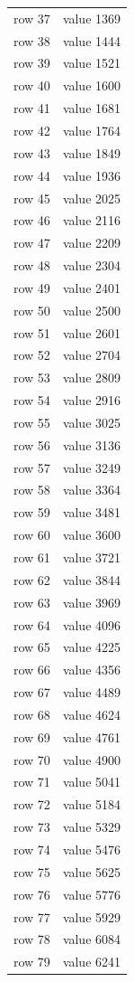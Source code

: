 \documentclass{article}
\begin{document}
\begin{longtable}{ll}
row 37 & value 1369\\
row 38 & value 1444\\
row 39 & value 1521\\
row 40 & value 1600\\
row 41 & value 1681\\
row 42 & value 1764\\
row 43 & value 1849\\
row 44 & value 1936\\
row 45 & value 2025\\
row 46 & value 2116\\
row 47 & value 2209\\
row 48 & value 2304\\
row 49 & value 2401\\
row 50 & value 2500\\
row 51 & value 2601\\
row 52 & value 2704\\
row 53 & value 2809\\
row 54 & value 2916\\
row 55 & value 3025\\
row 56 & value 3136\\
row 57 & value 3249\\
row 58 & value 3364\\
row 59 & value 3481\\
row 60 & value 3600\\
row 61 & value 3721\\
row 62 & value 3844\\
row 63 & value 3969\\
row 64 & value 4096\\
row 65 & value 4225\\
row 66 & value 4356\\
row 67 & value 4489\\
row 68 & value 4624\\
row 69 & value 4761\\
row 70 & value 4900\\
row 71 & value 5041\\
row 72 & value 5184\\
row 73 & value 5329\\
row 74 & value 5476\\
row 75 & value 5625\\
row 76 & value 5776\\
row 77 & value 5929\\
row 78 & value 6084\\
row 79 & value 6241\\
\end{longtable}
\end{document}
